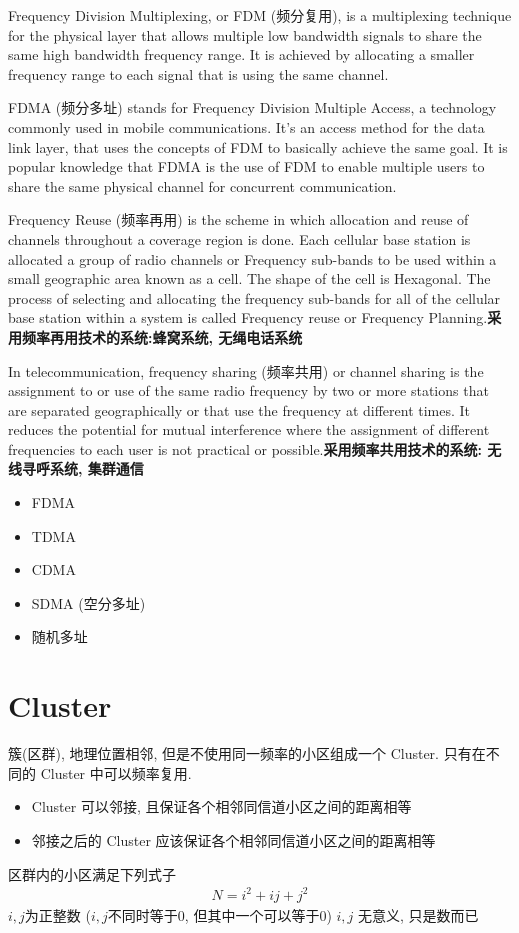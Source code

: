 \documentclass[a4paper]{report}
\begin{document}
Frequency Division Multiplexing, or FDM (频分复用), is a multiplexing technique for the physical layer that allows multiple low bandwidth signals to share the same high bandwidth frequency range. It is achieved by allocating a smaller frequency range to each signal that is using the same channel. 

FDMA (频分多址) stands for Frequency Division Multiple Access, a technology commonly used in mobile communications. It’s an access method for the data link layer, that uses the concepts of FDM to basically achieve the same goal. It is popular knowledge that FDMA is the use of FDM to enable multiple users to share the same physical channel for concurrent communication.

Frequency Reuse (频率再用) is the scheme in which allocation and reuse of channels throughout a coverage region is done. Each cellular base station is allocated a group of radio channels or Frequency sub-bands to be used within a small geographic area known as a cell. The shape of the cell is Hexagonal. The process of selecting and allocating the frequency sub-bands for all of the cellular base station within a system is called Frequency reuse or Frequency Planning.\textbf{采用频率再用技术的系统:蜂窝系统, 无绳电话系统}

In telecommunication, frequency sharing (频率共用) or channel sharing is the assignment to or use of the same radio frequency by two or more stations that are separated geographically or that use the frequency at different times. It reduces the potential for mutual interference where the assignment of different frequencies to each user is not practical or possible.\textbf{采用频率共用技术的系统: 无线寻呼系统, 集群通信}

\begin{itemize}
	\item FDMA
	\item TDMA
	\item CDMA
	\item SDMA (空分多址)
	\item 随机多址
\end{itemize}
 \section{Cluster} 
 簇(区群), 地理位置相邻, 但是不使用同一频率的小区组成一个 Cluster. 只有在不同的 Cluster 中可以频率复用. 
 \begin{itemize}
	 \item Cluster 可以邻接, 且保证各个相邻同信道小区之间的距离相等
	 \item 邻接之后的 Cluster 应该保证各个相邻同信道小区之间的距离相等
 \end{itemize}
 区群内的小区满足下列式子
 \begin{align*}
	 N = i^2 + ij + j^2
 \end{align*}
 $i,j$为正整数 ($i,j$不同时等于0, 但其中一个可以等于0) $i,j$ 无意义, 只是数而已
\end{document}
